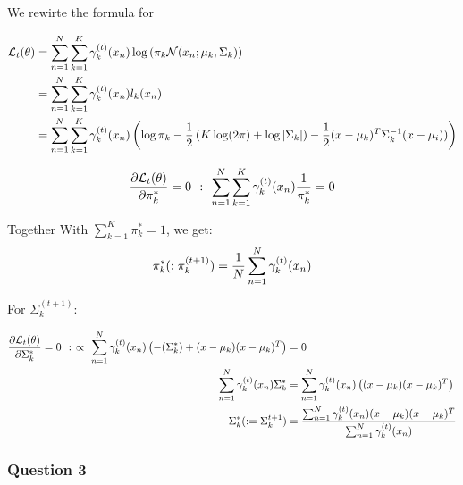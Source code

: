 \documentclass[11pt]{article}
\begin{document}
We rewirte the formula for

\begin{align*}
\large \mathcal{L}_t(\theta)  
& \large = \sum_{n=1}^N \sum_{k=1}^K \gamma_k^{(t)} (x_n) \log \left( \pi_k \mathcal{N}(x_n;\mu_k, \Sigma_k) \right)  \\
& \large =  \sum_{n=1}^N \sum_{k=1}^K \gamma_k^{(t)} (x_n) l_k(x_n)  \\
&  \large= \sum_{n=1}^N \sum_{k=1}^K \gamma_k^{(t)} (x_n) \left( \log \pi_k - \frac{1}{2} \left( K \log (2 \pi) + \log |\Sigma_k|\right) - \frac{1}{2}(x-\mu_k)^T \Sigma_k^{-1}(x-\mu_i))\right)
\end{align*}

\begin{align}
\large \frac{\partial \mathcal{L}_t(\theta) }{\partial \pi_k^*} = 0 
& \large \  : \  \sum_{n=1}^N \sum_{k=1}^K \gamma_k^{(t)}(x_n) \frac{1}{\pi_k^*}= 0  \\
\end{align}

Together With \(\sum_{k=1}^K \pi_k^*=1\), we get:
\[ \large \pi_k^* (:\pi_k^{(t+1)}) = \frac{1}{N}\sum_{n=1}^N \gamma_k^{(t)} (x_n) \]

    For \(\Sigma_k^{(t+1)}\):

\begin{align}
\large \frac{\partial \mathcal{L}_t(\theta) }{\partial \Sigma_k^*} = 0  
 \large \ : \  \propto \   \sum_{n=1}^N \gamma_k^{(t)} (x_n) \left( - (\Sigma_k^*) + (x-\mu_k) (x-\mu_k)^T \right) &= 0 \\
 \large\sum_{n=1}^N \gamma_k^{(t)} (x_n) \Sigma_k^* & = \sum_{n=1}^N \gamma_k^{(t)} (x_n) \left((x-\mu_k) (x-\mu_k)^T \right)\\
\large  \Sigma_k^* (: = \Sigma_k^{t+1}) & = \frac{\sum_{n=1}^N \gamma_k^{(t) } (x_n)(x-\mu_k) (x-\mu_k)^T}{\sum_{n=1}^N \gamma_k^{(t)} (x_n)} 
\end{align}

    \subsubsection{Question 3}\label{question-3}
\end{document}
